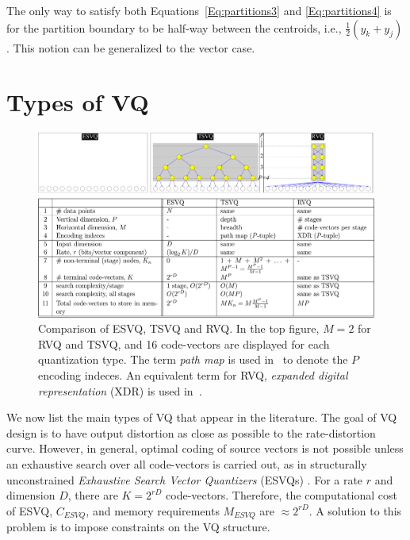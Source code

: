 The only way to satisfy both Equations~\ref{Eq:partitions3} and \ref{Eq:partitions4} is for the partition boundary to be half-way between the centroids, i.e., $\frac{1}{2} \left(y_k + y_j \right)$.  This notion can be generalized to the vector case.

\section{Types of VQ}
\label{sec:types_VQ}

								\begin{figure}[t]				
								\includegraphics[width=1.1\textwidth]{thesis/RVQ_comparisonWithESVQ_TSVQ.pdf}
								\caption{Comparison of ESVQ, TSVQ and RVQ.  In the top figure, $M=2$ for RVQ and TSVQ, and 16 code-vectors are displayed for each quantization type.  The term \emph{path map} is used in~\cite{1991_BOOK_VQ_GershoGray} to denote the $P$ encoding indeces.  An equivalent term for RVQ, \emph{expanded digital representation} (XDR) is used in~\cite{2007_JNL_IDDM_Barnes}.}
								\label{fig:comparison_ESVQ_TSVQ_RVQ}
								\end{figure}



We now list the main types of VQ that appear in the literature.  The goal of VQ design is to have output distortion as close as possible to the rate-distortion curve.  However, in general, optimal coding of source vectors is not possible unless an exhaustive search over all code-vectors is carried out, as in structurally unconstrained \emph{Exhaustive Search Vector Quantizers} (ESVQs) \cite{1992_JNL_RVQ_Barnes}.  For a rate $r$ and dimension $D$, there are $K=2^{rD}$ code-vectors.  Therefore, the computational cost of ESVQ, $C_{ESVQ}$, and memory requirements $M_{ESVQ}$ are $\approx 2^{rD}$.  A solution to this problem is to impose constraints on the VQ structure.  

